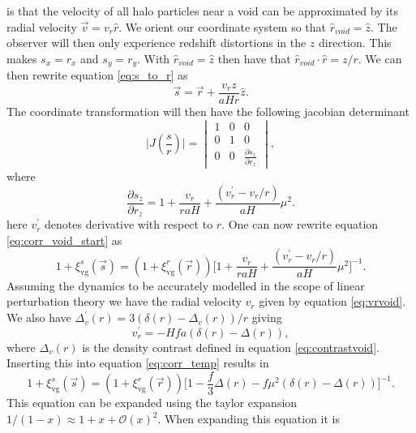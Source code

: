is that the velocity of all halo particles near a void can be approximated by
its radial velocity $\vec{v}=v_r \hat{r}$. We orient our coordinate system so that
$\hat{r}_{void}=\hat{z}$. The observer will then only experience redshift
distortions in the $z$ direction. This makes $s_x=r_x$ and $s_y=r_y$. With $\hat{r}_{void}=\hat{z}$ then have that
$\hat{r}_{void}\cdot\hat{r}=z/r$. We can then rewrite equation \ref{eq:s_to_r}
as
\begin{equation}
    \vec{s}=\vec{r}+\frac{v_rz}{aHr}\hat{z}.
\end{equation}
The coordinate transformation will then have the
following jacobian determinant
\begin{equation}
    \vert J(\frac{s}{r})\vert=
    \begin{vmatrix}
        1 & 0 & 0\\
        0 & 1 & 0\\
        0 & 0 & \frac{\partial s_z}{\partial r_z} 
    \end{vmatrix},
\end{equation}
where
\begin{equation}
    \frac{\partial s_z}{\partial r_z} = 1 + \frac{v_r}{raH}+\frac{(v_r^\prime-v_r/r)}{aH}\mu^2.
\end{equation}
here $v_r^\prime$ denotes derivative with respect to $r$. One can now rewrite
equation \ref{eq:corr_void_start} as
\begin{equation}\label{eq:corr_temp}
    1 + \xi^s_{\mathrm{vg}}(\vec{s})=(1 + \xi^r_{\mathrm{vg}}(\vec{r})) \Big[1 + \frac{v_r}{raH}+\frac{(v_r^\prime-v_r/r)}{aH}\mu^2 \Big]^{-1}.
\end{equation}
Assuming the dynamics to be accurately modelled in the scope of linear
perturbation theory we have the radial velocity $v_r$ given by equation
\ref{eq:vrvoid}. We also have $\Delta_v^\prime(r)=3(\delta(r)-\Delta_v(r))/r$ giving
\begin{equation}
    v_r^\prime=-Hfa(\delta(r)-\Delta(r)),
\end{equation}
where $\Delta_v(r)$ is the density contrast defined in equation
\ref{eq:contrastvoid}. Inserting this into equation \ref{eq:corr_temp} results
in
\begin{equation}\label{eq:corr_temp2}
    1 + \xi^s_{\mathrm{vg}}(\vec{s})=(1 + \xi^r_{\mathrm{vg}}(\vec{r})) \Big[1 -\frac{f}{3}\Delta(r)-f\mu^2(\delta(r)-\Delta(r))\Big]^{-1}.
\end{equation}
This equation can be expanded using the taylor expansion
$1/(1-x)\approx1+x+\mathcal{O}(x)^2$. When expanding this equation it is
